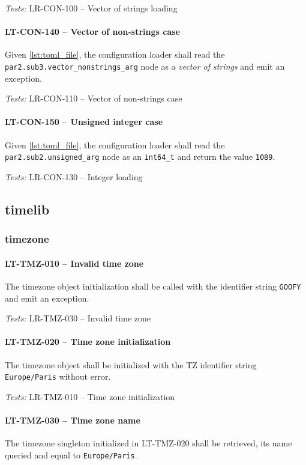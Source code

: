 \textit{Tests: } LR-CON-100 -- Vector of strings loading

\paragraph{LT-CON-140 -- Vector of non-strings case}
Given \cref{lst:toml_file}, the configuration loader shall read the
\lstinline{par2.sub3.vector_nonstrings_arg} node as a \emph{vector of strings}
and emit an exception.

\textit{Tests: } LR-CON-110 -- Vector of non-strings case

\paragraph{LT-CON-150 -- Unsigned integer case}
Given \cref{lst:toml_file}, the configuration loader shall read
the \lstinline{par2.sub2.unsigned_arg} node as an
\lstinline{int64_t} and return the value \lstinline{1089}.

\textit{Tests: } LR-CON-130 -- Integer loading

\subsection{time\textunderscore lib}
\subsubsection{time\textunderscore zone}
\paragraph{LT-TMZ-010 -- Invalid time zone}
The time\textunderscore zone object initialization shall be called with
the identifier string \lstinline{GOOFY} and emit an exception.

\textit{Tests: } LR-TMZ-030 -- Invalid time zone

\paragraph{LT-TMZ-020 -- Time zone initialization}
The time\textunderscore zone object shall be initialized with the TZ
identifier string \lstinline{Europe/Paris} without error.

\textit{Tests: } LR-TMZ-010 -- Time zone initialization

\paragraph{LT-TMZ-030 -- Time zone name}
The time\textunderscore zone singleton initialized in LT-TMZ-020 shall
be retrieved, its name queried and equal to \lstinline{Europe/Paris}.

